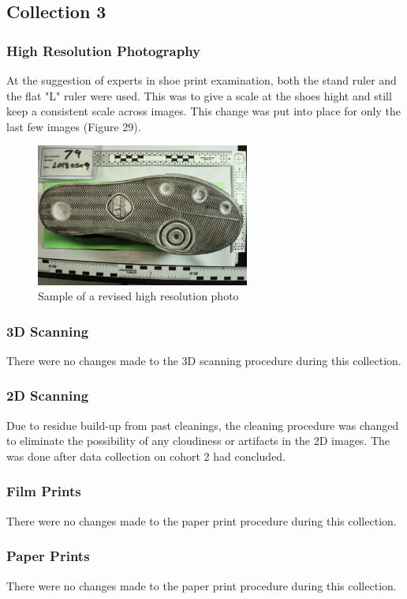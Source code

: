 \newpage


\subsection{Collection 3}

\subsubsection{High Resolution Photography}
At the suggestion of experts in shoe print examination, both the stand ruler and the flat "L" ruler were used. This was to give a scale at the shoes hight and still keep a consistent scale across images. This change was put into place for only the last few images (Figure 29). 

\begin{figure}[!htp]
\centering
\includegraphics[width=7cm]{New_photo__2_}
\caption{Sample of a revised high resolution photo}
\label{Image 29}
\end{figure}

\subsubsection{3D Scanning}
There were no changes made to the 3D scanning procedure during this collection. 
\subsubsection{2D Scanning}
Due to residue build-up from past cleanings, the cleaning procedure was changed to eliminate the possibility of any cloudiness or artifacts in the 2D images. The was done after data collection on cohort 2 had concluded. 
\subsubsection{Film Prints}
There were no changes made to the paper print procedure during this collection. 
\subsubsection{Paper Prints}
There were no changes made to the paper print procedure during this collection. 

